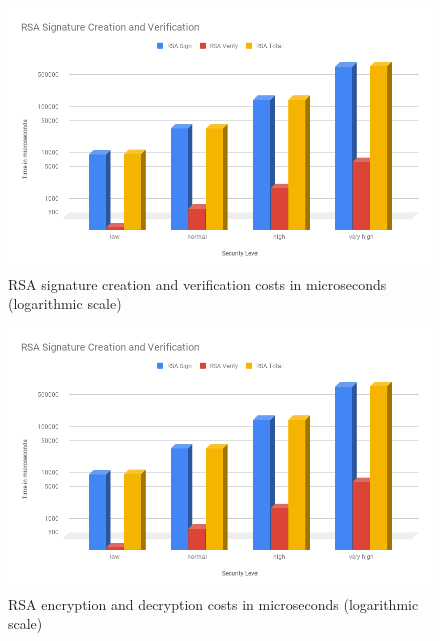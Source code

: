				  \begin{figure}
					\centering
					\includegraphics[width=1.0\textwidth]{img/papi-rsa-sign-verify.png}
					\centering \caption{RSA signature creation and verification costs in microseconds (logarithmic scale)}
					\label{af:4}
				  \end{figure}
  
				  \begin{figure}
					\centering
					\includegraphics[width=1.0\textwidth]{img/papi-rsa-sign-verify.png}
					\centering \caption{RSA encryption and decryption costs in microseconds (logarithmic scale)}
					\label{af:5}
				  \end{figure}
  
